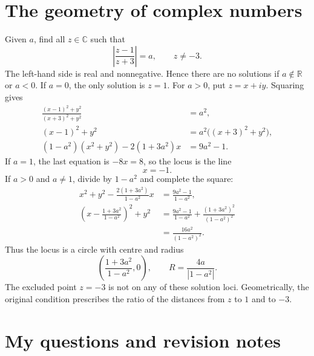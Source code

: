 \begin{center}
\end{center}

\section{The geometry of complex numbers}

\begin{example}
Given $a$, find all $z\in\mathbb C$ such that
\[
 \left|\frac{z-1}{z+3}\right|=a,\qquad z\ne-3.
\]
The left-hand side is real and nonnegative. Hence there are no solutions if
$a\notin\mathbb R$ or $a<0$.
If $a=0$, the only solution is $z=1$.
For $a>0$, put $z=x+iy$. Squaring gives
\begin{align*}
 \frac{(x-1)^2+y^2}{(x+3)^2+y^2}&=a^2,\\
 (x-1)^2+y^2&=a^2\bigl((x+3)^2+y^2\bigr),\\
 (1-a^2)(x^2+y^2)-2(1+3a^2)x&=9a^2-1.
\end{align*}
If $a=1$, the last equation is $-8x=8$, so the locus is the line
\[
 \boxed{x=-1}.
\]
If $a>0$ and $a\ne1$, divide by $1-a^2$ and complete the square:
\begin{align*}
 x^2+y^2-\frac{2(1+3a^2)}{1-a^2}x
 &=\frac{9a^2-1}{1-a^2},\\
 \left(x-\frac{1+3a^2}{1-a^2}\right)^2+y^2
 &=\frac{9a^2-1}{1-a^2}+\frac{(1+3a^2)^2}{(1-a^2)^2}\\
 &=\frac{16a^2}{(1-a^2)^2}.
\end{align*}
Thus the locus is a circle with centre and radius
\[
 \boxed{\left(\frac{1+3a^2}{1-a^2},0\right)},
 \qquad\boxed{R=\frac{4a}{|1-a^2|}}.
\]
The excluded point $z=-3$ is not on any of these solution loci.
Geometrically, the original condition prescribes the ratio of the distances
from $z$ to $1$ and to $-3$.
\end{example}

\section*{My questions and revision notes}
